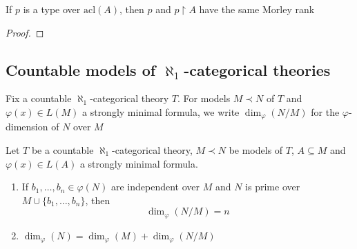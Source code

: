 \documentclass[11pt]{article}
\def \acl {\text{acl}}
\begin{document}
\begin{exercise}
\label{ex6.2.8}
If \(p\) is a type over \(\acl(A)\), then \(p\) and \(p\upharpoonright A\) have the same Morley rank
\end{exercise}

\begin{proof}

\end{proof}

\subsection{Countable models of \texorpdfstring{\(\aleph_1\)}{ℵ₁}-categorical theories}
\label{sec:org21ce577}
Fix a countable \(\aleph_1\)-categorical theory \(T\). For models \(M\prec N\) of \(T\) and \(\varphi(x)\in L(M)\)
a strongly minimal formula, we write \(\dim_\varphi(N/M)\) for the \(\varphi\)-dimension of \(N\) over \(M\)

\begin{theorem}[]
Let \(T\) be a countable \(\aleph_1\)-categorical theory, \(M\prec N\) be models of \(T\), \(A\subseteq M\)
and \(\varphi(x)\in L(A)\) a strongly minimal formula.
\begin{enumerate}
\item If \(b_1,\dots,b_n\in\varphi(N)\) are independent over \(M\) and \(N\) is prime over \(M\cup\{b_1,\dots,b_n\}\),
then
\begin{equation*}
\dim_\varphi(N/M)=n
\end{equation*}
\item \(\dim_\varphi(N)=\dim_\varphi(M)+\dim_\varphi(N/M)\)
\end{enumerate}
\end{theorem}
\end{document}
